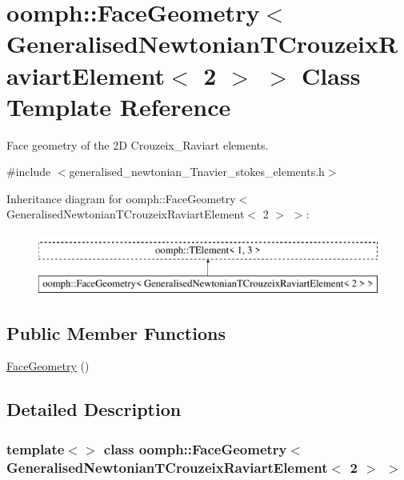 \hypertarget{classoomph_1_1FaceGeometry_3_01GeneralisedNewtonianTCrouzeixRaviartElement_3_012_01_4_01_4}{}\section{oomph\+:\+:Face\+Geometry$<$ Generalised\+Newtonian\+T\+Crouzeix\+Raviart\+Element$<$ 2 $>$ $>$ Class Template Reference}
\label{classoomph_1_1FaceGeometry_3_01GeneralisedNewtonianTCrouzeixRaviartElement_3_012_01_4_01_4}


Face geometry of the 2D Crouzeix\+\_\+\+Raviart elements.  




{\ttfamily \#include $<$generalised\+\_\+newtonian\+\_\+\+Tnavier\+\_\+stokes\+\_\+elements.\+h$>$}

Inheritance diagram for oomph\+:\+:Face\+Geometry$<$ Generalised\+Newtonian\+T\+Crouzeix\+Raviart\+Element$<$ 2 $>$ $>$\+:\begin{figure}[H]
\begin{center}
\leavevmode
\includegraphics[height=2.000000cm]{classoomph_1_1FaceGeometry_3_01GeneralisedNewtonianTCrouzeixRaviartElement_3_012_01_4_01_4}
\end{center}
\end{figure}
\subsection*{Public Member Functions}
\begin{DoxyCompactItemize}
\item 
\hyperlink{classoomph_1_1FaceGeometry_3_01GeneralisedNewtonianTCrouzeixRaviartElement_3_012_01_4_01_4_a44c830ef6f00f6c104cac57f7751f343}{Face\+Geometry} ()
\end{DoxyCompactItemize}


\subsection{Detailed Description}
\subsubsection*{template$<$$>$\newline
class oomph\+::\+Face\+Geometry$<$ Generalised\+Newtonian\+T\+Crouzeix\+Raviart\+Element$<$ 2 $>$ $>$}

